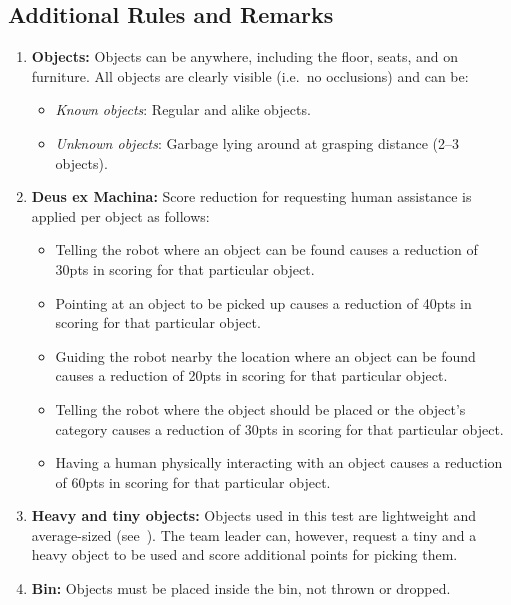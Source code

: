 \subsection*{Additional Rules and Remarks}
\begin{enumerate}[nosep]
	\item \textbf{Objects:}
	Objects can be anywhere, including the floor, seats, and on furniture.
	All objects are clearly visible (i.e.~no occlusions) and can be:
	\begin{itemize}[nosep]
		\item\textit{Known objects}: Regular and alike objects.
		\item\textit{Unknown objects}: Garbage lying around at grasping distance (2--3 objects).
	\end{itemize}

	\item \textbf{Deus ex Machina:} Score reduction for requesting human assistance is applied per object as follows:
	\begin{itemize}[nosep]
		\item Telling the robot where an object can be found causes a reduction of 30pts in scoring for that particular object.

		\item Pointing at an object to be picked up causes a reduction of 40pts in scoring for that particular object.

		\item Guiding the robot nearby the location where an object can be found causes a reduction of 20pts in scoring for that particular object.

		\item Telling the robot where the object should be placed or the object's category causes a reduction of 30pts in scoring for that particular object.

		\item Having a human physically interacting with an object causes a reduction of 60pts in scoring for that particular object.
	\end{itemize}

	\item \textbf{Heavy and tiny objects:} Objects used in this test are lightweight and average-sized (see~).
	The team leader can, however, request a tiny and a heavy object to be used and score additional points for picking them.

	\item \textbf{Bin:} Objects must be placed inside the bin, not thrown or dropped.
\end{enumerate}

